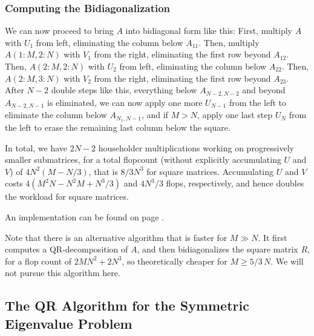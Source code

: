 \documentclass[11pt]{article}
\begin{document}
\subsubsection{Computing the Bidiagonalization}
We can now proceed to bring $A$ into bidiagonal form like this: First, multiply $A$ with $U_1$ from left, eliminating the column below $A_{11}$. Then, multiply $A(1:M,2:N)$ with $V_1$ from the right, eliminating the first row beyond $A_{12}$. Then, $A(2:M,2:N)$ with $U_2$ from left, eliminating the column below $A_{22}$. Then, $A(2:M,3:N)$ with $V_2$ from the right, eliminating the first row beyond $A_{23}$. After $N-2$ double steps like this, everything below $A_{N-2,N-2}$ and beyond $A_{N-2,N-1}$ is eliminated, we can now apply one more $U_{N-1}$ from the left to eliminate the column below $A_{N_1,N-1}$, and if $M>N$, apply one last step $U_N$ from the left to erase the remaining last column below the square.

In total, we have $2N-2$ householder multiplications working on progressively smaller submatrices, for a total flopcount (without explicitly accumulating $U$ and $V$) of $4N^2(M-N/3)$, that is $8/3N^3$ for square matrices. Accumulating $U$ and $V$ costs $4(M^2N-N^2M+N^3/3)$ and $4N^3/3$ flops, respectively, and hence doubles the workload for square matrices.

An implementation can be found on page \pageref{rc:bidighh}.

Note that there is an alternative algorithm that is faster for $M\gg N$. It first computes a QR-decomposition of $A$, and then bidiagonalizes the square matrix $R$, for a flop count of $2MN^2+2N^3$, so theoretically cheaper for $M\ge 5/3\,N$. We will not pursue this algorithm here.

\subsection{The QR Algorithm for the Symmetric Eigenvalue Problem}
\end{document}

